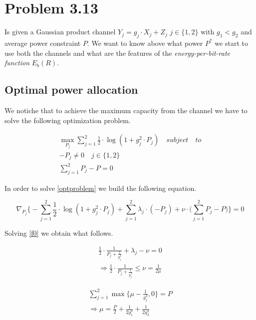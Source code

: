 \section{Problem 3.13}

Is given a Gaussian product channel $Y_j = g_j \cdot X_j + Z_j$ $j\in \{1,2\}$ with $g_1 < g_2$ and average power constraint $P$. We want to know above what power $P^*$ we start to use both the channels and what are the features of the \textit{energy-per-bit-rate function} $E_b(R)$.

\subsection{Optimal power allocation}


We notiche that to achieve the maximum capacity from the channel we have to solve the following optimization problem.

\begin{equation}
\begin{gathered}
	\max_{P_j} \sum_{j=1}^2 \frac{1}{2} \cdot \log(1+g_j^2 \cdot P_j) \quad subject \quad to\\
	-P_j \neq 0 \quad j\in \{1,2\} \\
	\sum_{j=1}^2 P_j - P = 0
\end{gathered}
\label{optproblem}
\end{equation}

In order to solve \eqref{optproblem} we build the following equation.

\begin{equation}
	\nabla_{P_j}\Big\{-\sum_{j=1}^2 \frac{1}{2} \cdot \log(1+g_j^2 \cdot P_j) + \sum_{j=1}^2 \lambda_j \cdot (-P_j) + \nu \cdot \Big(\sum_{j=1}^2 P_j - P\Big)  \Big\} = 0
	\label{f0}
\end{equation}

Solving \eqref{f0} we obtain what follows.

\begin{equation}
	\begin{gathered}
		\frac{1}{2} \cdot \frac{1}{P_j+\frac{1}{g_j^2}}+\lambda_j-\nu=0 \\
		\Rightarrow \frac{1}{2} \cdot \frac{1}{P_j+\frac{1}{g_j^2}} \leq \nu = \frac{1}{2\mu}
	\end{gathered}
\end{equation}

\begin{equation}
	\begin{gathered}
		\sum_{j=1}^2 \max\Big\{\mu - \frac{1}{g_j^2},0\Big\} = P \\
		\Rightarrow \mu = \frac{P}{2}+\frac{1}{2g_1^2} + \frac{1}{2g_2^2}
	\end{gathered}
\end{equation}

